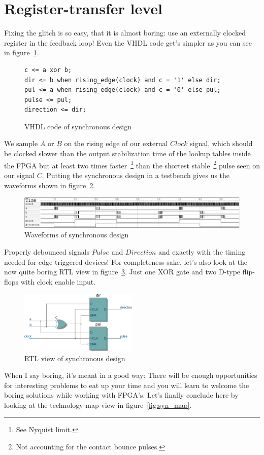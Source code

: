 \documentclass[a4paper]{article}
\begin{document}
\section{Register-transfer level}
Fixing the glitch is so easy, that it is almost boring: use an externally clocked register in the feedback loop!
Even the VHDL code get's simpler as you can see in figure~\ref{fig:syn_vhdl}.
\begin{figure}[h]
\centering
\begin{BVerbatim}
c <= a xor b;
dir <= b when rising_edge(clock) and c = '1' else dir;
pul <= a when rising_edge(clock) and c = '0' else pul;
pulse <= pul;
direction <= dir;
\end{BVerbatim}
\caption{VHDL code of synchronous design}
\label{fig:syn_vhdl}
\end{figure}
We sample $A$ or $B$ on the rising edge of our external $Clock$ signal, which should be clocked slower than the output stabilization time of the lookup tables inside the FPGA but at least two times faster~\footnote{See Nyquist limit.} than the shortest stable~\footnote{Not accounting for the contact bounce pulses.} pulse seen on our signal $C$.
Putting the synchronous design in a testbench gives us the waveforms shown in figure~\ref{fig:syn_wave}.
\begin{figure}[h]
\centering
\includegraphics[width=\textwidth]{quadrature_decoder_gtkwave.pdf}
\caption{Waveforms of synchronous design}
\label{fig:syn_wave}
\end{figure}
Properly debounced signals $Pulse$ and $Direction$ and exactly with the timing needed for edge triggered devices!
For completeness sake, let's also look at the now quite boring RTL view in figure~\ref{fig:syn_rtl}.
Just one XOR gate and two D-type flip-flops with clock enable input.
\begin{figure}[h]
\centering
\includegraphics[width=0.5\textwidth]{quadrature_decoder_quartus_rtl.pdf}
\caption{RTL view of synchronous design}
\label{fig:syn_rtl}
\end{figure}
When I say boring, it's meant in a good way:
There will be enough opportunities for interesting problems to eat up your time and you will learn to welcome the boring solutions while working with FPGA's.
Let's finally conclude here by looking at the technology map view in figure~\ref{fig:syn_map}.
\end{document}
